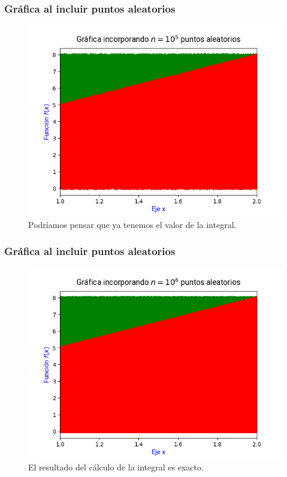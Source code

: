\documentclass[12pt]{beamer}
\begin{document}
\begin{frame}
\frametitle{Gráfica al incluir puntos aleatorios}
\begin{figure}
    \centering
    \includegraphics[scale=0.55]{Imagenes/area_puntos_05.png}
    \caption{Podríamos pensar que ya tenemos el valor de la integral.}
\end{figure}
\end{frame}
\begin{frame}
\frametitle{Gráfica al incluir puntos aleatorios}
\begin{figure}
    \centering
    \includegraphics[scale=0.55]{Imagenes/area_puntos_06.png}
    \caption{El resultado del cálculo de la integral es exacto.}
\end{figure}
\end{frame}
\end{document}
